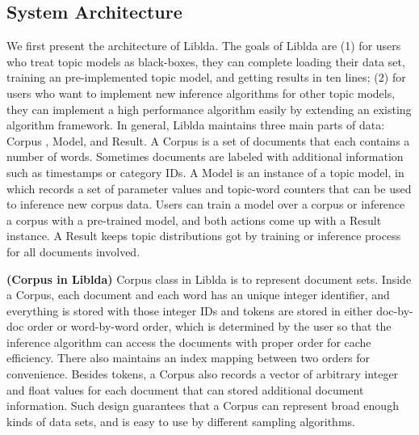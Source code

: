 \documentclass[10pt,journal,cspaper,compsoc]{IEEEtran}
\begin{document}
    \subsection{System Architecture}
    We first present the architecture of Liblda. The goals of Liblda are
    (1) for users who treat topic models as black-boxes, they can 
    complete loading their data set, training an pre-implemented topic model, and getting results in ten lines; (2) for users who want to implement 
    new inference algorithms for other topic models, they can implement
    a high performance algorithm easily by extending an existing algorithm
    framework. In general, Liblda maintains three main parts of data: Corpus , Model, and Result.
    A Corpus is a set of documents that each contains a number
    of words. Sometimes documents are labeled with additional 
    information such as timestamps or category IDs. A Model
    is an instance of a topic model, in which records a set of parameter values and topic-word counters that can be used to inference new corpus data.  
    Users can train a model over a corpus or inference a corpus with a pre-trained model, and both actions come up with a Result instance. 
    A Result keeps topic distributions got by training or inference process for all documents involved.
    
    \vspace{0.5em}
    \noindent
    {\bf (Corpus in Liblda)} Corpus class in Liblda is to 
    represent document sets. Inside a Corpus, each document and each word has an unique integer identifier, and everything is stored with those integer IDs and tokens are stored in either doc-by-doc order or word-by-word order, which is
    determined by the user so that the inference algorithm can access the documents with proper order for
    cache efficiency. There also maintains an index mapping between two orders for convenience. Besides tokens, a Corpus
    also records a vector of arbitrary integer and float values for each document that can stored additional document information. Such design
    guarantees that a Corpus can represent broad enough kinds of data sets,
    and is easy to use by different sampling algorithms. \\
    
\end{document}
